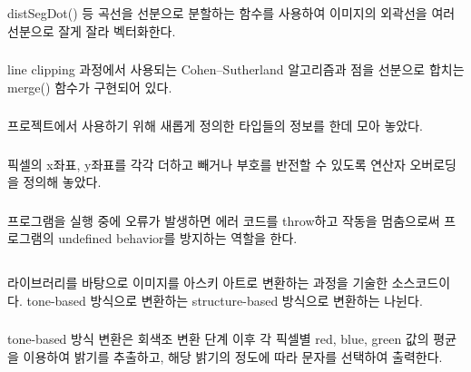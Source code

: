 \documentclass[conference]{IEEEtran}
\begin{document}
\subsubsection{\egTrace}

 distSegDot() 등 곡선을 선분으로 분할하는 함수를 사용하여 이미지의 외곽선을 여러 선분으로 잘게 잘라 벡터화한다.

\subsubsection{\egTool}

 line clipping 과정에서 사용되는 Cohen–Sutherland 알고리즘\cite{cohen-sutherland}과 점을 선분으로 합치는 merge() 함수가 구현되어 있다.

\subsubsection{\egTypes}

 프로젝트에서 사용하기 위해 새롭게 정의한 타입들의 정보를 한데 모아 놓았다.

\subsubsection{\egOperators}

 픽셀의 x좌표, y좌표를 각각 더하고 빼거나 부호를 반전할 수 있도록 연산자 오버로딩을 정의해 놓았다.

\subsubsection{\egExceptions}

 프로그램을 실행 중에 오류가 발생하면 에러 코드를 throw하고 작동을 멈춤으로써 프로그램의 undefined behavior를 방지하는 역할을 한다.

\subsection{\imgascii}

 \eg 라이브러리를 바탕으로 이미지를 아스키 아트로 변환하는 과정을 기술한 소스코드이다.
tone-based 방식으로 변환하는  structure-based 방식으로 변환하는  나뉜다.

\subsubsection{\tone}
tone-based 방식 변환은 회색조 변환 단계 이후 각 픽셀별 red, blue, green 값의 평균을 이용하여 밝기를 추출하고, 해당 밝기의 정도에 따라 문자를 선택하여 출력한다.
\end{document}
